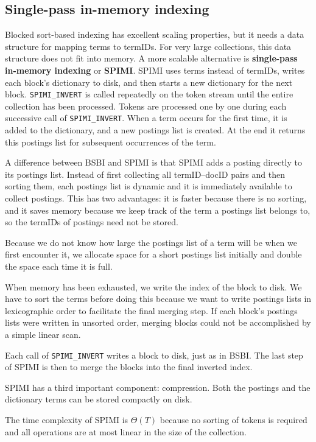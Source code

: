 \documentclass[letterpaper,11pt]{article}
\newcommand{\code}[1]{\texttt{#1}}
\begin{document}
\subsection{Single-pass in-memory indexing}
Blocked sort-based indexing has excellent scaling properties, but it needs a data structure for mapping terms to termIDs. For very large collections, this data structure does not fit into memory. A more scalable alternative is \textbf{single-pass in-memory indexing} or \textbf{SPIMI}. SPIMI uses terms instead of termIDs, writes each block’s dictionary to disk, and then starts a new dictionary for the next block. \code{SPIMI\_INVERT} is called repeatedly on the token stream until the entire collection has been processed. Tokens are processed one by one during each successive call of \code{SPIMI\_INVERT}. When a term occurs for the first time, it is added to the dictionary, and a new postings list is created. At the end it returns this postings list for subsequent occurrences of the term.

A difference between BSBI and SPIMI is that SPIMI adds a posting directly to its postings list. Instead of first collecting all termID–docID pairs and then sorting them, each postings list is dynamic and it is immediately available to collect postings. This has two advantages: it is faster because there is no sorting, and it saves memory because we keep track of the term a postings list belongs to, so the termIDs of postings need not be stored.

Because we do not know how large the postings list of a term will be when we first encounter it, we allocate space for a short postings list initially and double the space each time it is full.

When memory has been exhausted, we write the index of the block to disk. We have to sort the terms before doing this because we want to write postings lists in lexicographic order to facilitate the final merging step. If each block’s postings lists were written in unsorted order, merging blocks could not be accomplished by a simple linear scan.

Each call of \code{SPIMI\_INVERT} writes a block to disk, just as in BSBI. The last step of SPIMI is then to merge the blocks into the final inverted index.

SPIMI has a third important component: compression. Both the postings and the dictionary terms can be stored compactly on disk.

The time complexity of SPIMI is $\Theta(T)$ because no sorting of tokens is required and all operations are at most linear in the size of the collection.
\end{document}
